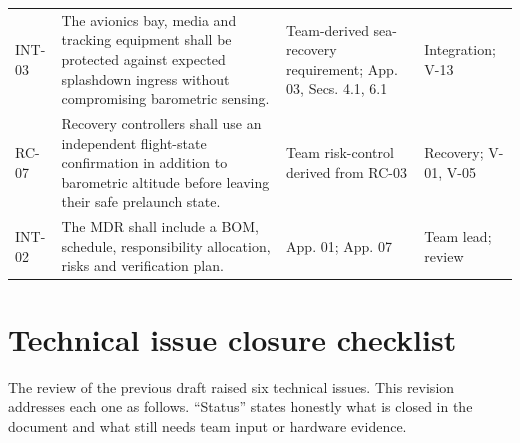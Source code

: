 \begin{longtable}{@{}L{12mm}L{71mm}L{33mm}L{34mm}@{}}
INT-03 & The avionics bay, media and tracking equipment shall be protected against expected splashdown ingress without compromising barometric sensing. & Team-derived sea-recovery requirement; App. 03, Secs. 4.1, 6.1 & Integration; V-13\\
RC-07 & Recovery controllers shall use an independent flight-state confirmation in addition to barometric altitude before leaving their safe prelaunch state. & Team risk-control derived from RC-03 & Recovery; V-01, V-05\\
INT-02 & The MDR shall include a BOM, schedule, responsibility allocation, risks and verification plan. & App. 01; App. 07 \cite{rtc2027app01,rtc2027app07} & Team lead; review\\
\end{longtable}
\normalsize

\section{Technical issue closure checklist}
The review of the previous draft raised six technical issues. This revision addresses each one as follows. ``Status'' states honestly what is closed in the document and what still needs team input or hardware evidence.

